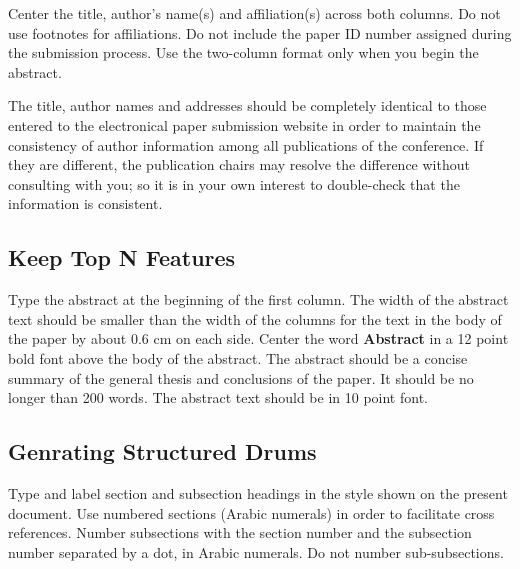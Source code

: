 \documentclass[11pt,a4paper]{article}
\begin{document}
Center the title, author's name(s) and affiliation(s) across both
columns. Do not use footnotes for affiliations. Do not include the
paper ID number assigned during the submission process. Use the
two-column format only when you begin the abstract.

The title, author names and addresses should be completely identical
to those entered to the electronical paper submission website in order
to maintain the consistency of author information among all
publications of the conference. If they are different, the publication
chairs may resolve the difference without consulting with you; so it
is in your own interest to double-check that the information is
consistent.

\subsection{Keep Top N Features }

Type the abstract at the beginning of the first
column. The width of the abstract text should be smaller than the
width of the columns for the text in the body of the paper by about
0.6 cm on each side. Center the word \textbf{Abstract} in a 12 point bold
font above the body of the abstract. The abstract should be a concise
summary of the general thesis and conclusions of the paper. It should
be no longer than 200 words. The abstract text should be in 10 point font.



\subsection{Genrating Structured Drums}

Type and label section and subsection headings in the
style shown on the present document.  Use numbered sections (Arabic
numerals) in order to facilitate cross references. Number subsections
with the section number and the subsection number separated by a dot,
in Arabic numerals.
Do not number sub-subsections.



%
\end{document}
